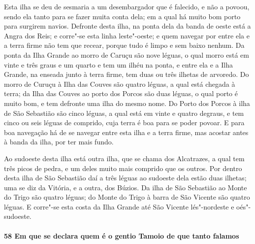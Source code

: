 Esta ilha se deu de sesmaria a um desembargador que é falecido, e não a povoou, sendo ela
tanto para se fazer muita conta dela; em a qual há muito bom porto para surgirem navios.
Defronte desta ilha, na ponta dela da banda de oeste está a Angra dos Reis; e corre"-se
esta linha leste"-oeste; e quem navegar por entre ela e a terra firme não tem que recear,
porque tudo é limpo e sem baixo nenhum. Da ponta da Ilha Grande ao morro de Caruçu são
nove léguas, o qual morro está em vinte e três graus e um quarto e tem um ilhéu na ponta,
e entre ela e a Ilha Grande, na enseada junto à terra firme, tem duas ou três ilhetas de
arvoredo. Do morro de Curuçu à Ilha das Couves são quatro léguas, a qual está chegada à
terra; da Ilha das Couves ao porto dos Porcos são duas léguas, o qual porto é muito bom, e
tem defronte uma ilha do mesmo nome. Do Porto dos Porcos à ilha de São Sebastião são cinco
léguas, a qual está em vinte e quatro degraus, e tem cinco ou seis léguas de comprido,
cuja terra é boa para se poder povoar. E para boa navegação há de se navegar entre esta
ilha e a terra firme, mas acostar antes à banda da ilha, por ter mais fundo.

Ao sudoeste desta ilha está outra ilha, que se chama dos Alcatrazes, a qual tem três picos
de pedra, e um deles muito mais comprido que os outros. Por dentro desta ilha de São
Sebastião daí a três léguas ao sudoeste dela estão duas ilhetas; uma se diz da Vitória, e
a outra, dos Búzios. Da ilha de São Sebastião ao Monte do Trigo são quatro léguas; do
Monte do Trigo à barra de São Vicente são quatro léguas. E corre"-se esta costa da Ilha
Grande até São Vicente lés"-nordeste e oés"-sudoeste.

\paragraph{58 Em que se declara quem é o gentio Tamoio de que tanto falamos}

